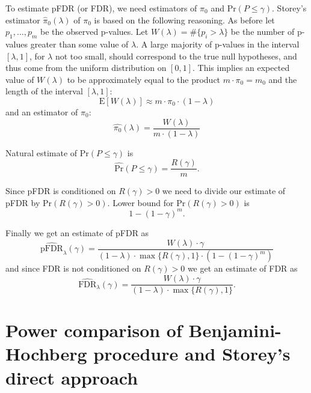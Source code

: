 \documentclass[10pt]{article}
\begin{document}
To estimate pFDR (or FDR), we need estimators of $\pi_{0}$ and $\text{Pr}(P \leq \gamma)$. Storey's estimator $\widehat{\pi}_{0}(\lambda)$ of $\pi_{0}$ is based on the following reasoning. As before let $p_{1}, ..., p_{m}$ be the observed p-values. Let $W(\lambda) = \# \lbrace p_{i} > \lambda \rbrace$ be the number of p-values greater than some value of $\lambda$. A large majority of p-values in the interval $[\lambda, 1]$, for $\lambda$ not too small, should correspond to the true null hypotheses, and thus come from the uniform distribution on $[0, 1]$. This implies an expected value of $W(\lambda)$ to be approximately equal to the product $m \cdot \pi_{0} = m_{0}$ and the length of the interval $[\lambda, 1]$: 
\begin{equation}
\text{E}[W(\lambda)] \approx m \cdot \pi_{0} \cdot (1 - \lambda)
\end{equation}
and an estimator of $\pi_{0}$:
\begin{equation}
\widehat{\pi_{0}}(\lambda) = \frac{W(\lambda)}{m \cdot (1-\lambda)}
\end{equation}

Natural estimate of $\text{Pr}(P \leq \gamma)$ is 
\begin{equation}
\widehat{\text{Pr}}(P \leq \gamma) = \frac{R(\gamma)}{m}.
\end{equation}

Since pFDR is conditioned on $R(\gamma) > 0$ we need to divide our estimate of pFDR by $\text{Pr}(R(\gamma) > 0)$. Lower bound for $\text{Pr}(R(\gamma) > 0)$ is 
\begin{equation}
1 - (1 - \gamma)^{m}.
\end{equation}

Finally we get an estimate of pFDR as
\begin{equation}
\widehat{\text{pFDR}}_{\lambda}(\gamma) =
\frac{W(\lambda) \cdot \gamma}{(1 - \lambda) \cdot \max \lbrace R(\gamma), 1 \rbrace \cdot \left( 1 - (1 - \gamma)^{m} \right)}
\end{equation}
and since FDR is not conditioned on $R(\gamma) > 0$ we get an estimate of FDR as
\begin{equation}
\widehat{\text{FDR}}_{\lambda}(\gamma) =
\frac{W(\lambda) \cdot \gamma}{(1 - \lambda) \cdot \max \lbrace R(\gamma), 1 \rbrace}.
\end{equation}



\section{Power comparison of Benjamini-Hochberg procedure and Storey's direct approach} \label{sec: 1st}
\end{document}
